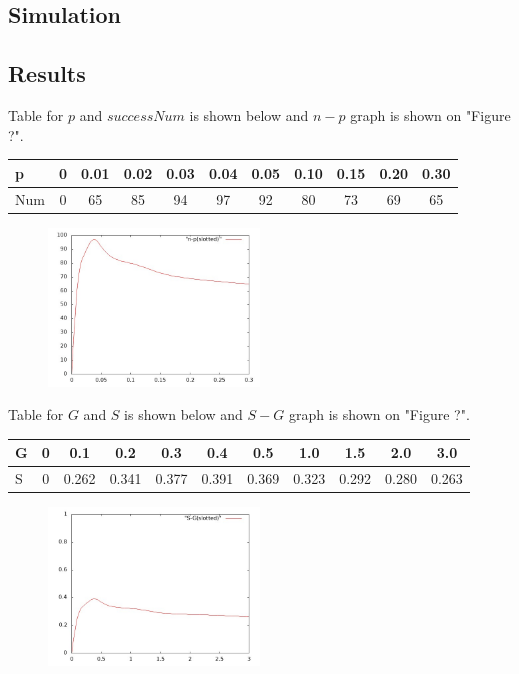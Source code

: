 \documentclass[11pt,a4paper]{report}
\begin{document}
\subsection*{Simulation}


\subsection*{Results}
Table for \(p\) and \(successNum\) is shown below and \(n-p\) graph is shown on "Figure ?".
\begin{table}[htbp]
\begin{tabular}{lcccccccccc}
\toprule
p & 0 & 0.01 & 0.02  & 0.03 & 0.04 & 0.05 & 0.10 & 0.15 & 0.20 & 0.30 \\
\midrule
Num & 0 & 65 & 85 & 94 & 97 & 92 & 80 & 73 & 69 & 65 \\
\bottomrule
\end{tabular}
\end{table}

\begin{figure}
\centering
\includegraphics[width=0.5\textwidth]{2_1.jpg}
\caption{}
\end{figure}

Table for \(G\) and \(S\) is shown below and \(S-G\) graph is shown on "Figure ?".
\begin{table}[htbp]
\begin{tabular}{lcccccccccc}
\toprule
G & 0 & 0.1 & 0.2  & 0.3 & 0.4 & 0.5 & 1.0 & 1.5 & 2.0 & 3.0 \\
\midrule
S & 0 & 0.262 & 0.341 & 0.377 & 0.391 & 0.369 & 0.323 & 0.292 & 0.280 & 0.263 \\
\bottomrule
\end{tabular}
\end{table}

\begin{figure}
\centering
\includegraphics[width=0.5\textwidth]{2_2.jpg}
\caption{}
\end{figure}
\end{document}
